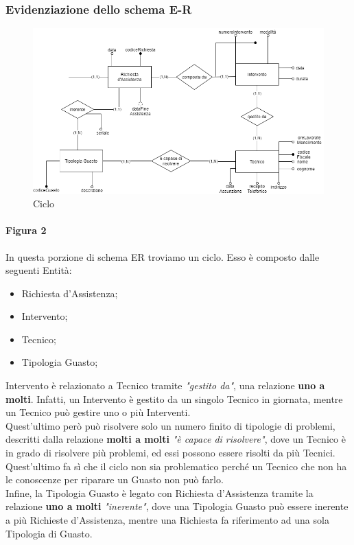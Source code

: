 \documentclass[legalpaper]{article}
\begin{document}
\subsubsection{Evidenziazione dello schema E-R}



\begin{figure}[!ht]
	\centering
	\begin{minipage}[b]{0.8\textwidth}
		\includegraphics[width=\linewidth]{image/ciclo.png}
			\caption{Ciclo}
		\label{fig:ciclo}

	\end{minipage}
\hfill

\end{figure}

\paragraph{Figura 2}
In questa porzione di schema ER troviamo un ciclo. Esso è composto dalle seguenti Entità: 
		\begin{itemize}
			\item Richiesta d'Assistenza;
			\item Intervento;
			\item Tecnico;
			\item Tipologia Guasto;
		\end{itemize}
		
		Intervento è relazionato a Tecnico tramite \textit{"gestito da"}, una relazione \textbf{uno a molti}. Infatti, un Intervento è gestito da un singolo Tecnico in giornata, mentre un Tecnico può gestire uno o più Interventi.\\	
		Quest'ultimo però può risolvere solo un numero finito di tipologie di problemi, descritti dalla relazione \textbf{molti a molti} \textit{"è capace di risolvere"}, dove un Tecnico è in grado di risolvere più problemi, ed essi possono essere risolti da più Tecnici.\\
		Quest'ultimo fa sì che il ciclo non sia problematico perché un Tecnico che non ha le conoscenze per riparare un Guasto non può farlo.\\
		Infine, la Tipologia Guasto è legato con Richiesta d'Assistenza tramite la relazione \textbf{uno a molti} \textit{"inerente"}, dove una Tipologia Guasto può essere inerente a più Richieste d'Assistenza, mentre una Richiesta fa riferimento ad una sola Tipologia di Guasto.
\end{document}
